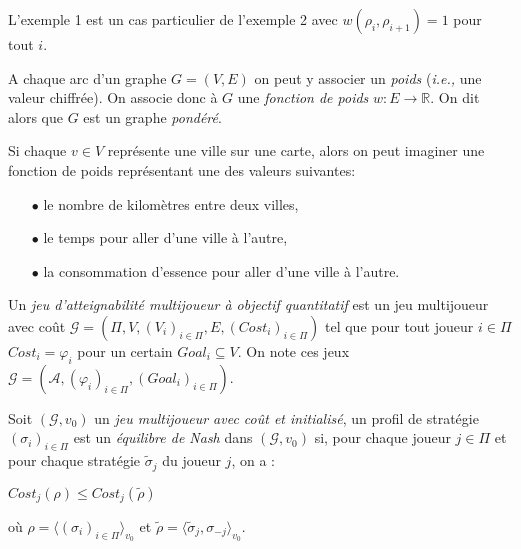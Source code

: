 \begin{rem}
	L'exemple 1 est un cas particulier de l'exemple 2 avec $w(\rho_{i},\rho_{i+1}) = 1$ pour tout $i$.
\end{rem}

\begin{defi}
	\label{def:fonctionPoids}
	A chaque arc d'un graphe $G = (V,E)$ on peut y associer un \textit{poids} (\emph{i.e.,} une valeur chiffrée). On associe donc à $G$ une \textit{fonction de poids}  $w : E \rightarrow \mathbb{R}$. On dit alors que $G$ est un graphe \textit{pondéré}.
\end{defi}

\begin{exemple}
	Si chaque $v \in V$ représente une ville sur une carte, alors on peut imaginer une fonction de poids représentant une des valeurs suivantes:
	\begin{enumerate}
		\item [$\bullet$] le nombre de kilomètres entre deux villes,
		\item [$\bullet$] le temps pour aller d'une ville à l'autre,
		\item [$\bullet$] la consommation d'essence pour aller d'une ville à l'autre.
	\end{enumerate}
\end{exemple}



\begin{defi}
	
	Un \textit{jeu d'atteignabilité multijoueur à objectif quantitatif} est un jeu multijoueur avec coût $\mathcal{G} = (\Pi ,V ,(V_{i})_{i \in \Pi} ,E ,(Cost_{i})_{i \in \Pi})$ tel que pour tout joueur $i \in \Pi$ $Cost_{i} = \varphi _{i}$ pour un certain $Goal _{i} \subseteq V$.
	On note ces jeux $\mathcal{G} = (\mathcal{A},(\varphi _{i})_{i\in \Pi},(Goal_{i})_{i \in \Pi})$.
\end{defi}
	










\begin{defi}
	
	Soit $(\mathcal{G}, v_{0})$ un \textit{jeu multijoueur avec coût et initialisé}, un profil de stratégie $(\sigma _{i})_{i \in \Pi}$ est un \textit{équilibre de Nash} dans $(\mathcal{G}, v_{0})$ si, pour chaque joueur $j \in \Pi$ et pour chaque stratégie $\tilde{\sigma}_{j}$ du joueur $j$, on a :
	\begin{center}$ Cost_{j}(\rho) \leq Cost_{j}(\tilde{\rho})$ \end{center}
	où $\rho = \langle (\sigma _{i})_{i \in \Pi}\rangle_{v_0}$ et $\tilde{\rho} = \langle \tilde{\sigma} _{j} ,\sigma _{-j}\rangle_{v_0}$.
\end{defi}	


